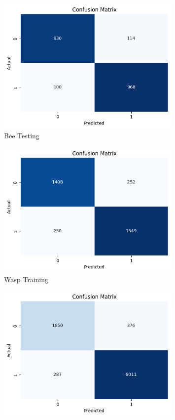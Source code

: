 \documentclass[12pt]{article}
\begin{document}
\begin{enumerate}
\begin{figure}[H]
\begin{minipage}{0.45\textwidth}
				\includegraphics[width=0.8\textwidth]{Images/Confusion/mobile bees test.png} \\ \vspace{0.25 cm}
				Bee Testing
			\end{minipage}
			\newline
			\begin{minipage}{0.45\textwidth}
				\vspace{ 1.5 cm}
				\centering
				\includegraphics[width=0.8\textwidth]{Images/Confusion/mobile wasps train.png} \\ \vspace{0.25 cm}
				Wasp Training
			\end{minipage}
			\hfill
			\begin{minipage}{0.45\textwidth}
				\centering
				\includegraphics[width=0.8\textwidth]{Images/Confusion/mobile wasps test.png} \\ \vspace{0.25 cm}

\end{minipage}
\end{figure}
\end{enumerate}
\end{document}
